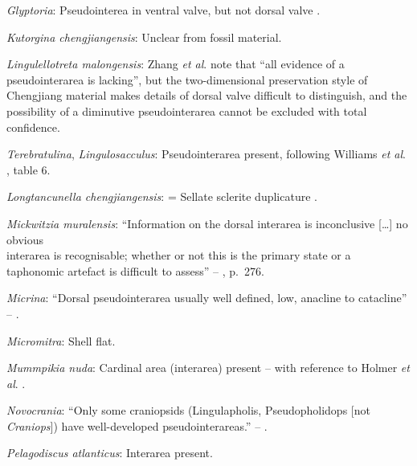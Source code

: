 \documentclass[openany]{book}
\theoremstyle{definition}
\theoremstyle{definition}
\theoremstyle{definition}
\theoremstyle{remark}
\begin{document}
\hypertarget{Glyptoria-coding-85}{}
\emph{Glyptoria}: Pseudointerea in ventral valve, but not dorsal valve
\citep[2007]{Williams2000LinguliformeaCraniiformea}.

\hypertarget{Kutorgina_chengjiangensis-coding-85}{}
\emph{Kutorgina chengjiangensis}: Unclear from fossil material.

\hypertarget{Lingulellotreta_malongensis-coding-85}{}
\emph{Lingulellotreta malongensis}: Zhang \emph{et al}.
\citeyearpar{Zhang2011Theexceptionally} note that ``all evidence of a
pseudointerarea is lacking'', but the two-dimensional preservation style
of Chengjiang material makes details of dorsal valve difficult to
distinguish, and the possibility of a diminutive pseudointerarea cannot
be excluded with total confidence.

\hypertarget{Lingulosacculus-coding-85}{}
\emph{Terebratulina}, \emph{Lingulosacculus}: Pseudointerarea present,
following Williams \emph{et al}.
\citeyearpar{Williams2000LinguliformeaCraniiformea}, table 6.

\hypertarget{Longtancunella_chengjiangensis-coding-85}{}
\emph{Longtancunella chengjiangensis}: = Sellate sclerite duplicature
\citep{Holmer2008TheEarly}.

\hypertarget{Mickwitzia_muralensis-coding-85}{}
\emph{Mickwitzia muralensis}: ``Information on the dorsal interarea is
inconclusive {[}\ldots{}{]} no obvious\\
interarea is recognisable; whether or not this is the primary state or a
taphonomic artefact is difficult to assess'' --
\citet{Balthasar2008iMummpikia}, p.~276.

\hypertarget{Micrina-coding-85}{}
\emph{Micrina}: ``Dorsal pseudointerarea usually well defined, low,
anacline to catacline'' --
\citet{Williams2000LinguliformeaCraniiformea}.

\hypertarget{Micromitra-coding-85}{}
\emph{Micromitra}: Shell flat.

\hypertarget{Mummpikia_nuda-coding-85}{}
\emph{Mummpikia nuda}: Cardinal area (interarea) present -- with
reference to Holmer \emph{et al}.
\citeyearpar{Holmer2018Evolutionarysignificance}.

\hypertarget{Novocrania-coding-85}{}
\emph{Novocrania}: ``Only some craniopsids (Lingulapholis,
Pseudopholidops {[}not \emph{Craniops}{]}) have well-developed
pseudointerareas.'' -- \citet{Williams2000LinguliformeaCraniiformea}.

\hypertarget{Pelagodiscus_atlanticus-coding-85}{}
\emph{Pelagodiscus atlanticus}: Interarea present.
\end{document}
